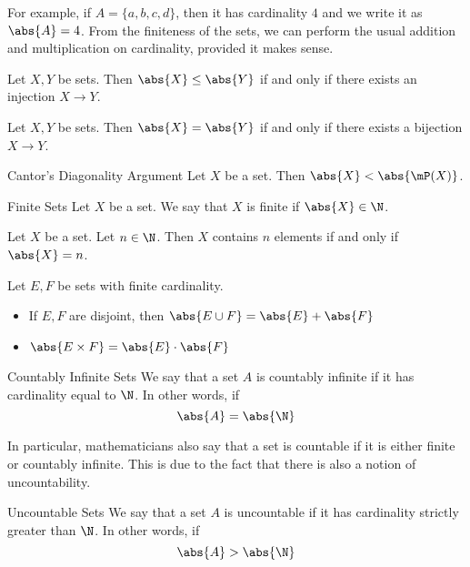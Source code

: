 \documentclass[a4paper]{article}
\begin{document}
For example, if $A=\{a,b,c,d\}$, then it has cardinality $4$ and we write it as $\abs{A}=4$. From the finiteness of the sets, we can perform the usual addition and multiplication on cardinality, provided it makes sense. 

\begin{prp}{}{} Let $X,Y$ be sets. Then $\abs{X}\leq\abs{Y}$ if and only if there exists an injection $X\to Y$. 
\end{prp}

\begin{prp}{}{} Let $X,Y$ be sets. Then $\abs{X}=\abs{Y}$ if and only if there exists a bijection $X\to Y$. 
\end{prp}

\begin{prp}{Cantor's Diagonality Argument}{} Let $X$ be a set. Then $\abs{X}<\abs{\mP(X)}$. 
\end{prp}

\begin{defn}{Finite Sets}{} Let $X$ be a set. We say that $X$ is finite if $\abs{X}\in\N$. 
\end{defn}

\begin{lmm}{}{} Let $X$ be a set. Let $n\in\N$. Then $X$ contains $n$ elements if and only if $\abs{X}=n$. 
\end{lmm}

\begin{prp}{}{} Let $E,F$ be sets with finite cardinality. 
\begin{itemize}
\item If $E,F$ are disjoint, then $\abs{E\cup F}=\abs{E}+\abs{F}$
\item $\abs{E\times F}=\abs{E}\cdot\abs{F}$
\end{itemize}
\end{prp}

\begin{defn}{Countably Infinite Sets}{} We say that a set $A$ is countably infinite if it has cardinality equal to $\N$. In other words, if $$\abs{A}=\abs{\N}$$
\end{defn}

In particular, mathematicians also say that a set is countable if it is either finite or countably infinite. This is due to the fact that there is also a notion of uncountability. 

\begin{defn}{Uncountable Sets}{} We say that a set $A$ is uncountable if it has cardinality strictly greater than $\N$. In other words, if $$\abs{A}>\abs{\N}$$
\end{defn}
\end{document}
